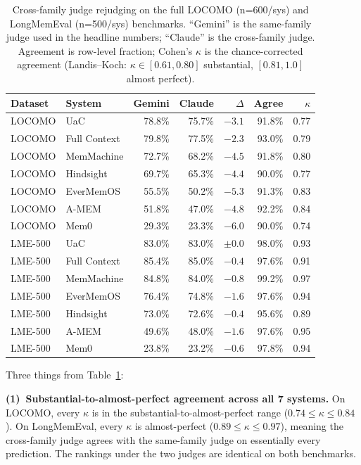 \begin{table}[!ht]
\centering
\caption{Cross-family judge rejudging on the full LOCOMO (n=600/sys) and LongMemEval (n=500/sys) benchmarks. ``Gemini'' is the same-family judge used in the headline numbers; ``Claude'' is the cross-family judge. Agreement is row-level fraction; Cohen's $\kappa$ is the chance-corrected agreement (Landis--Koch: $\kappa{\in}[0.61,0.80]$ substantial, $[0.81,1.0]$ almost perfect).}
\label{tab:judge-rejudge}
\small
\begin{tabular}{@{}llrrrrr@{}}
\toprule
\textbf{Dataset} & \textbf{System} & \textbf{Gemini} & \textbf{Claude} & $\Delta$ & \textbf{Agree} & $\kappa$ \\
\midrule
LOCOMO & UaC       & 78.8\% & 75.7\% & $-3.1$ & 91.8\% & 0.77 \\
LOCOMO & Full Context & 79.8\% & 77.5\% & $-2.3$ & 93.0\% & 0.79 \\
LOCOMO & MemMachine   & 72.7\% & 68.2\% & $-4.5$ & 91.8\% & 0.80 \\
LOCOMO & Hindsight    & 69.7\% & 65.3\% & $-4.4$ & 90.0\% & 0.77 \\
LOCOMO & EverMemOS    & 55.5\% & 50.2\% & $-5.3$ & 91.3\% & 0.83 \\
LOCOMO & A-MEM        & 51.8\% & 47.0\% & $-4.8$ & 92.2\% & 0.84 \\
LOCOMO & Mem0         & 29.3\% & 23.3\% & $-6.0$ & 90.0\% & 0.74 \\
\midrule
LME-500 & UaC       & 83.0\% & 83.0\% & $\pm 0.0$ & 98.0\% & 0.93 \\
LME-500 & Full Context & 85.4\% & 85.0\% & $-0.4$ & 97.6\% & 0.91 \\
LME-500 & MemMachine   & 84.8\% & 84.0\% & $-0.8$ & 99.2\% & 0.97 \\
LME-500 & EverMemOS    & 76.4\% & 74.8\% & $-1.6$ & 97.6\% & 0.94 \\
LME-500 & Hindsight    & 73.0\% & 72.6\% & $-0.4$ & 95.6\% & 0.89 \\
LME-500 & A-MEM        & 49.6\% & 48.0\% & $-1.6$ & 97.6\% & 0.95 \\
LME-500 & Mem0         & 23.8\% & 23.2\% & $-0.6$ & 97.8\% & 0.94 \\
\bottomrule
\end{tabular}
\end{table}

Three things from Table~\ref{tab:judge-rejudge}:

\textbf{(1)~Substantial-to-almost-perfect agreement across all 7 systems.} On LOCOMO, every $\kappa$ is in the substantial-to-almost-perfect range ($0.74 \leq \kappa \leq 0.84$). On LongMemEval, every $\kappa$ is almost-perfect ($0.89 \leq \kappa \leq 0.97$), meaning the cross-family judge agrees with the same-family judge on essentially every prediction. The rankings under the two judges are identical on both benchmarks.

